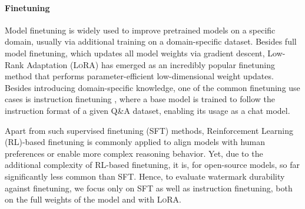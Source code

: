 \paragraph{Finetuning}
Model finetuning is widely used to improve pretrained models on a specific domain, usually via additional training on a domain-specific dataset. 
Besides full model finetuning, which updates all model weights via gradient descent, Low-Rank Adaptation (\textsc{LoRA}) \citep{lora} has emerged as an incredibly popular finetuning method that performs parameter-efficient low-dimensional weight updates. 
Besides introducing domain-specific knowledge, one of the common finetuning use cases is instruction finetuning \citep{instruction_tuning}, where a base model is trained to follow the instruction format of a given Q\&A dataset, enabling its usage as a chat model.

Apart from such supervised finetuning (SFT) methods, Reinforcement Learning (RL)-based finetuning \citep{rlhf, rl_survey} is commonly applied to align models with human preferences or enable more complex reasoning behavior. 
Yet, due to the additional complexity of RL-based finetuning, it is, for open-source models, so far significantly less common than SFT.
Hence, to evaluate watermark durability against finetuning, we focus only on SFT as well as instruction finetuning, both on the full weights of the model and with \textsc{LoRA}.
  
